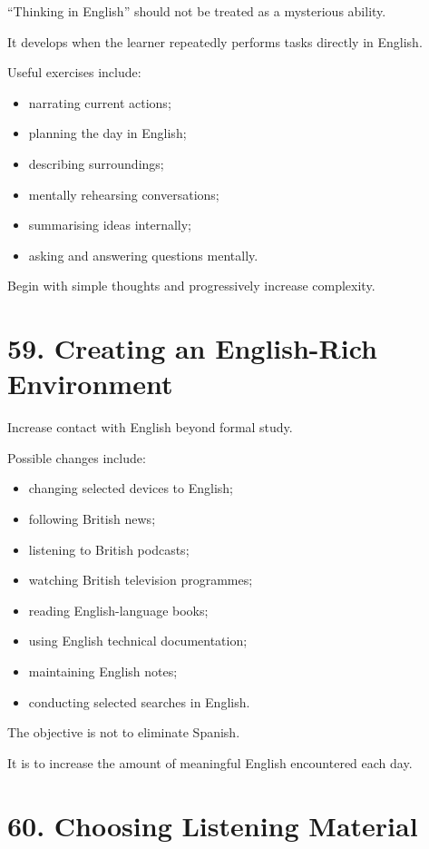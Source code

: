 ``Thinking in English'' should not be treated as a mysterious ability.

It develops when the learner repeatedly performs tasks directly in English.

Useful exercises include:

\begin{itemize}
    \item narrating current actions;
    \item planning the day in English;
    \item describing surroundings;
    \item mentally rehearsing conversations;
    \item summarising ideas internally;
    \item asking and answering questions mentally.
\end{itemize}

Begin with simple thoughts and progressively increase complexity.

\section*{59. Creating an English-Rich Environment}

Increase contact with English beyond formal study.

Possible changes include:

\begin{itemize}
    \item changing selected devices to English;
    \item following British news;
    \item listening to British podcasts;
    \item watching British television programmes;
    \item reading English-language books;
    \item using English technical documentation;
    \item maintaining English notes;
    \item conducting selected searches in English.
\end{itemize}

The objective is not to eliminate Spanish.

It is to increase the amount of meaningful English encountered each day.

\section*{60. Choosing Listening Material}


